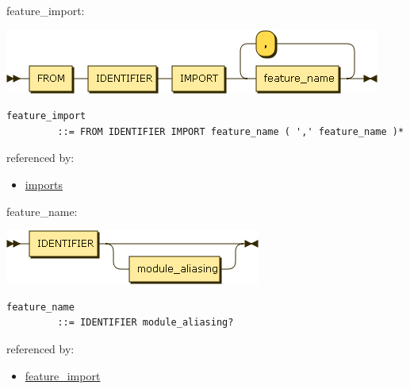 \begin{minipage}{\textwidth}
\protect\hypertarget{feature_import}{}{feature\_import:}

\includegraphics[width=4.87500in,height=0.83333in]{diagram/feature_import.png}

\begin{verbatim}
feature_import
         ::= FROM IDENTIFIER IMPORT feature_name ( ',' feature_name )*
\end{verbatim}

referenced by:

\begin{itemize}
\tightlist
\item
  \protect\hyperlink{imports}{imports}
\end{itemize}

\end{minipage}

\begin{minipage}{\textwidth}
\protect\hypertarget{feature_name}{}{feature\_name:}

\includegraphics[width=3.31250in,height=0.70833in]{diagram/feature_name.png}

\begin{verbatim}
feature_name
         ::= IDENTIFIER module_aliasing?
\end{verbatim}

referenced by:

\begin{itemize}
\tightlist
\item
  \protect\hyperlink{feature_import}{feature\_import}
\end{itemize}

\end{minipage}

